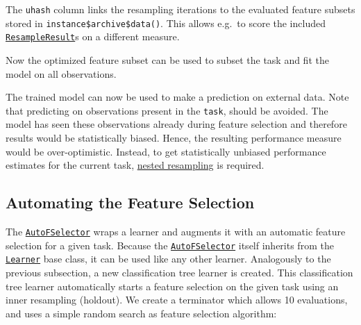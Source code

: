 \documentclass[
]{scrbook}
\newenvironment{Shaded}{\begin{snugshade}}{\end{snugshade}}
\newcommand{\FunctionTok}[1]{\textcolor[rgb]{0.00,0.00,0.00}{#1}}
\newcommand{\NormalTok}[1]{#1}
\newcommand{\SpecialCharTok}[1]{\textcolor[rgb]{0.00,0.00,0.00}{#1}}
\renewenvironment{Shaded} {\begin{snugshade}\small} {\end{snugshade}}
\begin{document}
The \texttt{uhash} column links the resampling iterations to the evaluated feature subsets stored in \texttt{instance\$archive\$data()}. This allows e.g.~to score the included \href{https://mlr3.mlr-org.com/reference/ResampleResult.html}{\texttt{ResampleResult}}s on a different measure.

Now the optimized feature subset can be used to subset the task and fit the model on all observations.

\begin{Shaded}
\end{Shaded}

The trained model can now be used to make a prediction on external data.
Note that predicting on observations present in the \texttt{task}, should be avoided.
The model has seen these observations already during feature selection and therefore results would be statistically biased.
Hence, the resulting performance measure would be over-optimistic.
Instead, to get statistically unbiased performance estimates for the current task, \protect\hyperlink{nested-resampling}{nested resampling} is required.

\hypertarget{autofselect}{%
\subsection{Automating the Feature Selection}\label{autofselect}}

The \href{https://mlr3fselect.mlr-org.com/reference/AutoFSelector.html}{\texttt{AutoFSelector}} wraps a learner and augments it with an automatic feature selection for a given task.
Because the \href{https://mlr3fselect.mlr-org.com/reference/AutoFSelector.html}{\texttt{AutoFSelector}} itself inherits from the \href{https://mlr3.mlr-org.com/reference/Learner.html}{\texttt{Learner}} base class, it can be used like any other learner.
Analogously to the previous subsection, a new classification tree learner is created.
This classification tree learner automatically starts a feature selection on the given task using an inner resampling (holdout).
We create a terminator which allows 10 evaluations, and uses a simple random search as feature selection algorithm:
\end{document}
